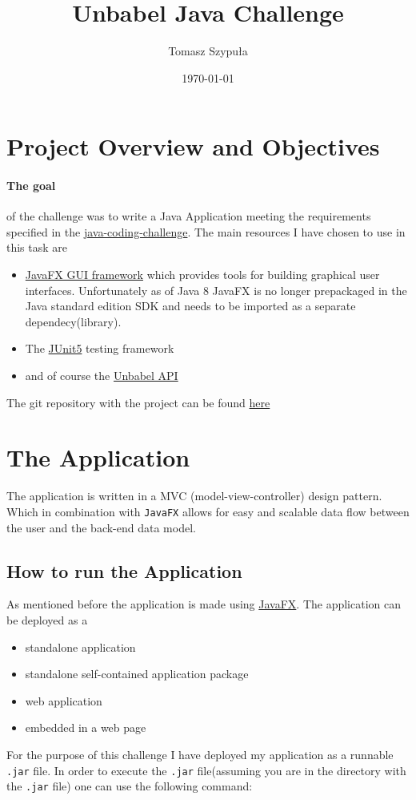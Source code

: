 \documentclass[12pt]{article}
\title{\Huge{Unbabel Java Challenge}}
\author{Tomasz Szypuła}
\date{\today}
\begin{document}
\maketitle
\section{Project Overview and Objectives }
\paragraph{The goal}of the challenge was to write a Java Application meeting the requirements specified in the \href{ https://github.com/Unbabel/java-coding-challenge}{java-coding-challenge}. The main resources I have chosen to use in this task are 
\begin{itemize}
\item \href{https://docs.oracle.com/javase/8/javafx/get-started-tutorial/jfx-overview.htm#JFXST784}{JavaFX GUI framework} which provides tools for building graphical user interfaces. Unfortunately as of Java 8 JavaFX is no longer prepackaged in the Java standard edition SDK and needs to be imported as a separate dependecy(library).
\item The \href{https://junit.org/junit5/}{JUnit5} testing framework 
\item and of course the \href{http://developers.unbabel.com/}{Unbabel API} 
\end{itemize}
The git repository with the project can be found \href{https://github.com/Longman006/java-coding-challenge}{here}

 


\section{The Application}
The application is written in a MVC (model-view-controller) design pattern. Which in combination with \texttt{JavaFX} allows for easy and scalable data flow between the user and the back-end data model.
\subsection{How to run the Application}
As mentioned before the application is made using \href{https://openjfx.io/javadoc/11/}{JavaFX}. The application can be deployed as a
\begin{itemize}
\item standalone application
\item standalone self-contained application package
\item web application
\item embedded in a web page
\end{itemize}
For the purpose of this challenge I have deployed my application as a runnable \texttt{.jar} file. In order to execute the \texttt{.jar} file(assuming you are in the directory with the \texttt{.jar} file) one can use the following command: 
\end{document}
